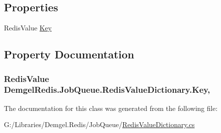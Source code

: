 \subsection*{Properties}
\begin{DoxyCompactItemize}
\item 
Redis\+Value \hyperlink{class_demgel_redis_1_1_job_queue_1_1_redis_value_dictionary_a70b5dc71c77ef44bf5dfcef41843e206}{Key}
\end{DoxyCompactItemize}


\subsection{Property Documentation}
\hypertarget{class_demgel_redis_1_1_job_queue_1_1_redis_value_dictionary_a70b5dc71c77ef44bf5dfcef41843e206}{}
\subsubsection[{Key}]{\setlength{\rightskip}{0pt plus 5cm}Redis\+Value Demgel\+Redis.\+Job\+Queue.\+Redis\+Value\+Dictionary.\+Key\hspace{0.3cm}{\ttfamily [get]}, {\ttfamily [set]}}\label{class_demgel_redis_1_1_job_queue_1_1_redis_value_dictionary_a70b5dc71c77ef44bf5dfcef41843e206}


The documentation for this class was generated from the following file\+:\begin{DoxyCompactItemize}
\item 
G\+:/\+Libraries/\+Demgel.\+Redis/\+Job\+Queue/\hyperlink{_redis_value_dictionary_8cs}{Redis\+Value\+Dictionary.\+cs}\end{DoxyCompactItemize}

